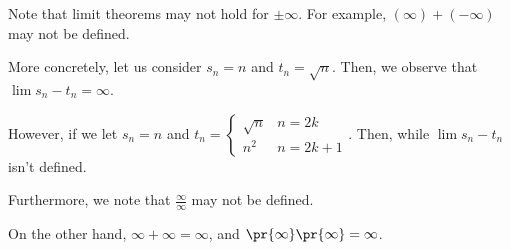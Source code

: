 \documentclass[openany]{book}
\begin{document}
\begin{rmk}
	Note that limit theorems may not hold for $\pm \infty$. For example, $(\infty) + (-\infty)$ may not be defined.
	
	More concretely, let us consider $s_n = n$ and $t_n = \sqrt{n}$. Then, we observe that $\lim s_n - t_n = \infty$.
	
	However, if we let $s_n = n$ and $t_n = \begin{cases}
	\sqrt{n} & n = 2k \\ n^{2} & n = 2k+1 \end{cases}$. Then, while $\lim s_n - t_n$ isn't defined.
	
	Furthermore, we note that $\frac{\infty}{\infty}$ may not be defined.
	
	On the other hand, $\infty + \infty = \infty$, and $\pr{\infty}\pr{\infty} = \infty$.
\end{rmk}
\end{document}
